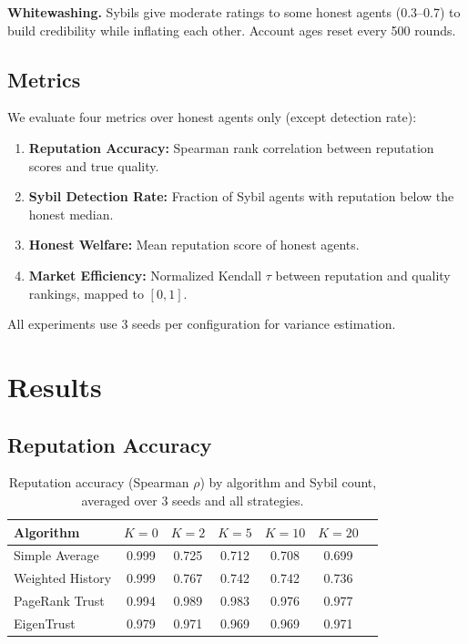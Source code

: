 \documentclass[11pt]{article}
\begin{document}
\textbf{Whitewashing.} Sybils give moderate ratings to some honest agents (0.3--0.7) to build credibility while inflating each other. Account ages reset every 500 rounds.

\subsection{Metrics}

We evaluate four metrics over honest agents only (except detection rate):

\begin{enumerate}
\item \textbf{Reputation Accuracy:} Spearman rank correlation between reputation scores and true quality.
\item \textbf{Sybil Detection Rate:} Fraction of Sybil agents with reputation below the honest median.
\item \textbf{Honest Welfare:} Mean reputation score of honest agents.
\item \textbf{Market Efficiency:} Normalized Kendall $\tau$ between reputation and quality rankings, mapped to $[0, 1]$.
\end{enumerate}

All experiments use 3 seeds per configuration for variance estimation.

\section{Results}

\subsection{Reputation Accuracy}

\begin{table}[h]
\centering
\caption{Reputation accuracy (Spearman $\rho$) by algorithm and Sybil count, averaged over 3 seeds and all strategies.}
\label{tab:accuracy}
\begin{tabular}{lcccccc}
\toprule
Algorithm & $K{=}0$ & $K{=}2$ & $K{=}5$ & $K{=}10$ & $K{=}20$ \\
\midrule
Simple Average & 0.999 & 0.725 & 0.712 & 0.708 & 0.699 \\
Weighted History & 0.999 & 0.767 & 0.742 & 0.742 & 0.736 \\
PageRank Trust & 0.994 & 0.989 & 0.983 & 0.976 & 0.977 \\
EigenTrust & 0.979 & 0.971 & 0.969 & 0.969 & 0.971 \\
\bottomrule
\end{tabular}
\end{table}
\end{document}
